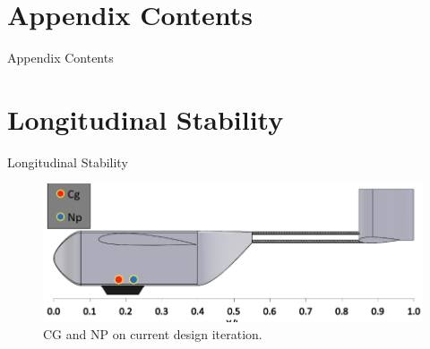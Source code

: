 \documentclass{beamer}
\newif\ifshowpresenterbox
\newif\ifshowheadline
\begin{document}
    \appendix

    \section*{Appendix Contents}

    \showpresenterboxfalse
    \showheadlinefalse

    \begin{frame}{Appendix Contents}
        \tableofcontents
    \end{frame}

    \section{Longitudinal Stability}

    \begin{frame}{Longitudinal Stability}
        \centering
        \begin{figure}
            \includegraphics[width=\textwidth]{figures/currentiterationCGNP.png}
            \caption{CG and NP on current design iteration.}
        \end{figure}
    \end{frame}
\end{document}
